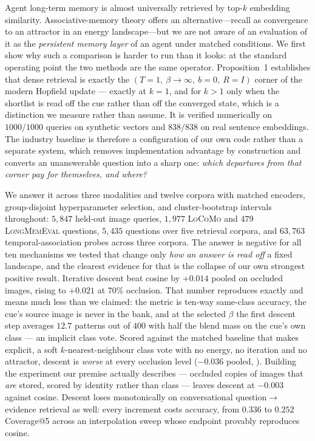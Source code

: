 Agent long-term memory is almost universally retrieved by top-$k$ embedding similarity.
Associative-memory theory offers an alternative---recall as convergence to an attractor in
an energy landscape---but we are not aware of an evaluation of it as the \emph{persistent
memory layer} of an agent under matched conditions. We first show why such a comparison is
harder to run than it looks: at the standard operating point the two methods are the same
operator. Proposition~1
establishes that dense retrieval is exactly the $(T{=}1,\ \beta\!\to\!\infty,\
b{=}0,\ R{=}I)$ corner of the modern Hopfield update --- exactly at $k{=}1$, and for
$k>1$ only when the shortlist is read off the cue rather than off the converged state,
which is a distinction we measure rather than assume. It is verified numerically on
$1000/1000$ queries on synthetic vectors and $838/838$ on real sentence embeddings. The industry baseline is
therefore a configuration of our own code rather than a separate system, which removes
implementation advantage by construction and converts an unanswerable question into a
sharp one: \emph{which departures from that corner pay for themselves, and where?}

We answer it across three modalities and twelve corpora with matched encoders,
group-disjoint hyperparameter selection, and cluster-bootstrap intervals throughout:
$5{,}847$ held-out image queries, $1{,}977$ \textsc{LoCoMo} and $479$
\textsc{LongMemEval} questions, $5{,}435$ questions over five retrieval corpora, and
$63{,}763$ temporal-association probes across three corpora. The answer is negative for
all ten mechanisms we tested that change only \emph{how an answer is read off} a fixed
landscape, and the clearest evidence for that is the collapse of our own strongest positive
result.
Iterative descent beat cosine by $+0.014$ pooled  on occluded images,
rising to $+0.021$ at 70\% occlusion. That number reproduces exactly and means much less
than we claimed: the metric is ten-way same-class accuracy, the cue's source image is
never in the bank, and at the selected $\beta$ the first descent step averages $12.7$
patterns out of $400$ with half the blend mass on the cue's own class --- an implicit
class vote. Scored against the matched baseline that makes explicit, a soft
$k$-nearest-neighbour class vote with no energy, no iteration and no attractor, descent is
\emph{worse} at every occlusion level ($-0.036$ pooled, \ci{-0.043}{-0.028}). Building the
experiment our premise actually describes --- occluded copies of images that \emph{are}
stored, scored by identity rather than class --- leaves descent at $-0.003$
\ci{-0.008}{+0.000} against cosine. Descent loses monotonically on conversational
question$\to$evidence retrieval as well: every increment costs accuracy, from $0.336$ to
$0.252$ Coverage@5 across an interpolation sweep whose endpoint provably reproduces cosine.

